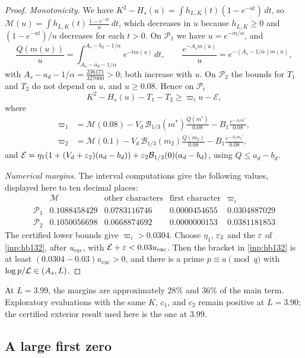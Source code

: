 \begin{proof}
\emph{Monotonicity.} We have $K^2-H_s(u)=\int h_{L,K}(t)(1-e^{-ut})\,dt$, so
$\mathcal M(u)=\int h_{L,K}(t)\,\frac{1-e^{-ut}}u\,dt$, which decreases in $u$ because $h_{L,K}\ge0$ and
$(1-e^{-ut})/u$ decreases for each $t>0$. On $\mathcal P_1$ we have
$u=e^{-m/\alpha}$, and
\[
  \frac{Q(m(u))}u=\int_{A_s-a_d-1/\alpha}^{A_s-b_d-1/\alpha}e^{-tm(u)}\,dt,\qquad\frac{e^{-A_sm(u)}}u=e^{-(A_s-1/\alpha)m(u)},
\]
with $A_s-a_d-1/\alpha=\frac{236171}{327000}>0$; both increase with $u$. On $\mathcal P_2$ the bounds for $T_1$ and
$T_2$ do not depend on $u$, and $u\ge0.08$. Hence on $\mathcal P_i$
\[
  K^2-H_s(u)-T_1-T_2\ge\varpi_iu-\mathcal E,
\]
where
\begin{align*}
  \varpi_1&=\mathcal M(0.08)-V_d\,\mathcal B_{1/3}(m^*)\frac{Q(m^*)}{0.08}-B_1\frac{e^{-A_sm^*}}{0.08},\\
  \varpi_2&=\mathcal M(0.1)-V_d\,\mathcal B_{1/3}(m_2)\frac{Q(m_2)}{0.08}-B_1\frac{e^{-A_sm_2'}}{0.08},
\end{align*}
and $\mathcal E=\eta_1(1+(V_d+\varepsilon_2)(a_d-b_d))+\varepsilon_2\mathcal B_{1/3}(0)(a_d-b_d)$, using $Q\le a_d-b_d$.

\emph{Numerical margins.} The interval computations give the following values,
displayed here to ten decimal places:
\[
  \begin{array}{lcccc}
    & \mathcal M & \text{other characters} & \text{first character} & \varpi_i\\
    \mathcal P_1 & 0.1088458429 & 0.0783116746 & 0.0000454655 & 0.0304887029\\
    \mathcal P_2 & 0.1050056698 & 0.0668874692 & 0.0000000153 & 0.0381181853
  \end{array}
\]
The certified lower bounds give $\varpi_i>0.0304$. Choose $\eta_1$, $\varepsilon_2$ and the $\varepsilon$ of \cref{inp:hb132}, after $u_{\mathrm{exc}}$, with
$\mathcal E+\varepsilon<0.03u_{\mathrm{exc}}$. Then the bracket in \cref{inp:hb132} is at least $(0.0304-0.03)u_{\mathrm{exc}}>0$, and there is a
prime $p\equiv a\pmod q$ with $\log p/\mathcal{L}\in(A_s,L)$.
\end{proof}

At $L=3.99$, the margins are approximately $28\%$ and $36\%$ of the main term.
Exploratory evaluations with the same $K$, $c_1$, and $c_2$ remain positive at $L=3.90$;
the certified exterior result used here is the one at $3.99$.

\subsection{A large first zero}\label{subsec:large}

